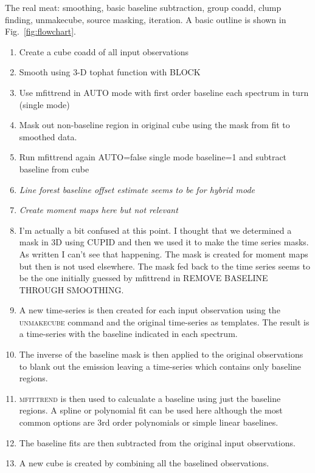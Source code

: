 \documentclass[final,authoryear,5p,times,twocolumn]{elsarticle}
\begin{document}
The real meat: smoothing, basic baseline subtraction, group coadd,
clump finding, unmakecube, source masking, iteration. A basic outline
is shown in Fig.\ \ref{fig:flowchart}.

\begin{enumerate}
\item Create a cube coadd of all input observations
\item Smooth using 3-D tophat function with BLOCK
\item Use mfittrend in AUTO mode with first order baseline each
  spectrum in turn (single mode)
\item Mask out non-baseline region in original cube using the mask
  from fit to smoothed data.
\item Run mfittrend again AUTO=false single mode baseline=1 and
  subtract baseline from cube
\item \textit{Line forest baseline offset estimate seems to be for
    hybrid mode}
\item \textit{Create moment maps here but not relevant}
\item I'm actually a bit confused at this point. I thought that we
  determined a mask in 3D using CUPID and then we used it to make the
  time series masks. As written I can't see that happening. The mask
  is created for moment maps but then is not used elsewhere. The mask
  fed back to the time series seems to be the one initially guessed by
  mfittrend in REMOVE BASELINE THROUGH SMOOTHING.

\item A new time-series is then created for each input observation
  using the \textsc{unmakecube} command and the original time-series
  as templates. The result is a time-series with the baseline
  indicated in each spectrum.

\item The inverse of the baseline mask is then applied to the original
  observations to blank out the emission leaving a time-series which
  contains only baseline regions.

\item \textsc{mfittrend} is then used to calcualate a baseline using
  just the baseline regions. A spline or polynomial fit can be used
  here although the most common options are 3rd order polynomials or
  simple linear baselines.

\item The baseline fits are then subtracted from the original input
  observations.

\item A new cube is created by combining all the baselined observations.

\end{enumerate}
\end{document}
